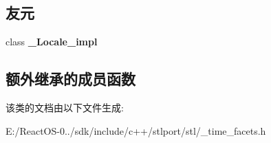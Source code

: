\subsection*{友元}
\begin{DoxyCompactItemize}
\item 
\mbox{\label{classtime__put__byname_ae9c09ac7cd16ad35f8fdb1587ac77eb8}} 
class {\bfseries \+\_\+\+Locale\+\_\+impl}
\end{DoxyCompactItemize}
\subsection*{额外继承的成员函数}


该类的文档由以下文件生成\+:\begin{DoxyCompactItemize}
\item 
E\+:/\+React\+O\+S-\/0../sdk/include/c++/stlport/stl/\+\_\+time\+\_\+facets.\+h\end{DoxyCompactItemize}
